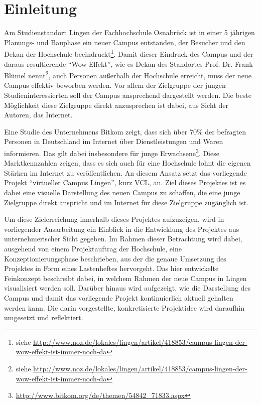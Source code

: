 \section{Einleitung}
\label{sec:Einleitung}

Am Studienstandort Lingen der Fachhochschule Osnabrück ist in einer 5 jährigen Planungs- und Bauphase
ein neuer Campus entstanden, der Besucher und den Dekan der Hochschule beeindruckt\footnote{siehe \url{http://www.noz.de/lokales/lingen/artikel/418853/campus-lingen-der-wow-effekt-ist-immer-noch-da}}.
Damit dieser Eindruck des Campus und der daraus resultierende "`Wow-Effekt"', wie es Dekan des Standortes 
Prof. Dr. Frank Blümel nennt\footnote{siehe \url{http://www.noz.de/lokales/lingen/artikel/418853/campus-lingen-der-wow-effekt-ist-immer-noch-da}}, auch Personen außerhalb der Hochschule erreicht, muss der neue Campus
effektiv beworben werden. Vor allem der Zielgruppe der jungen Studieninteressierten soll
der Campus ansprechend dargestellt werden. Die beste Möglichkeit diese Zielgruppe direkt anzusprechen
ist dabei, aus Sicht der Autoren, das Internet.

Eine Studie des Unternehmens Bitkom zeigt, dass sich über 70\% der befragten Personen in Deutschland
im Internet über Dienstleistungen und Waren informieren. Das gilt dabei insbesondere für junge
Erwachsene\footnote{\url{http://www.bitkom.org/de/themen/54842_71833.aspx}}.
Diese Marktkennzahlen zeigen, dass es sich auch für eine Hochschule lohnt die eigenen
Stärken im Internet zu veröffentlichen. An diesem Ansatz setzt das vorliegende Projekt
"`virtueller Campus Lingen"', kurz VCL, an. Ziel dieses Projektes ist es dabei
eine visuelle Darstellung des neuen Campus zu schaffen, die eine junge Zielgruppe direkt anspricht
und im Internet für diese Zielgruppe zugänglich ist.

Um diese Zielerreichung innerhalb dieses Projektes aufzuzeigen, wird in vorliegender Ausarbeitung
ein Einblick in die Entwicklung des Projektes aus unternehmerischer Sicht gegeben.
Im Rahmen dieser Betrachtung wird dabei, ausgehend von einem Projektauftrag der Hochschule,
eine Konzeptionierungsphase beschrieben, aus der die genaue Umsetzung des Projektes in Form
eines Lastenheftes hervorgeht. Das hier entwickelte Feinkonzept beschreibt dabei,
in welchem Rahmen der neue Campus in Lingen visualisiert werden soll. Darüber hinaus
wird aufgezeigt, wie die Darstellung des Campus und damit das vorliegende Projekt kontinuierlich aktuell
gehalten werden kann. Die darin vorgestellte, konkretisierte Projektidee wird 
daraufhin umgesetzt und reflektiert.

